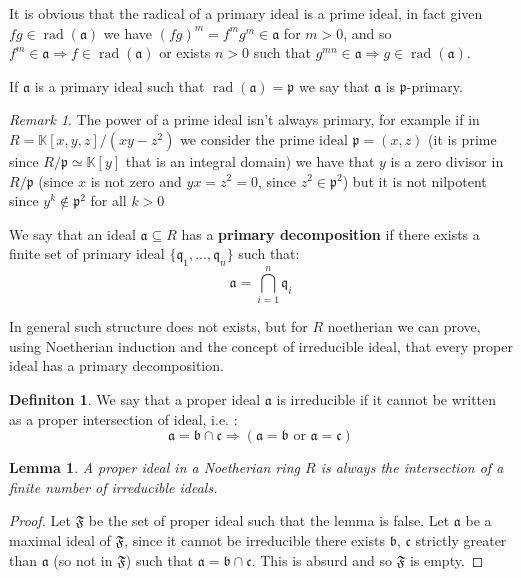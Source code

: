 \documentclass[notitlepage, a4]{book}
\theoremstyle{plain}
\newtheorem{lem}[teo]{Lemma}
\theoremstyle{remark}
\newtheorem{rem}{Remark}
\theoremstyle{definition}
\newtheorem{deff}[teo]{Definiton}
\newcommand{\K}{\mathbb{K}}
\newcommand{\p}{\mathfrak{p}}
\newcommand{\q}{\mathfrak{q}}
\newcommand{\A}{\mathfrak{a}}
\newcommand{\B}{\mathfrak{b}}
\newcommand{\Cc}{\mathfrak{c}}
\DeclareMathOperator{\rad}{rad}
\begin{document}
It is obvious that the radical of a primary ideal is a prime ideal, in fact given $ fg \in \rad(\A)  $ we have $ (fg)^m = f^m g^m \in \A $ for $ m>0 $, and so $ f^m \in \A \Rightarrow f \in \rad(\A)$ or exists $ n>0 $ such that $ g^{mn} \in \A \Rightarrow g \in \rad(\A) $.

If $ \A $ is a primary ideal such that $ \rad(\A) = \p $ we say that $ \A $ is {$ \p $-primary}.

\begin{rem} \label{rem:power_primary} The power of a prime ideal isn't always primary, for example if in $ R = \K[x,y,z] / (xy - z^2) $ we consider the prime ideal $ \p = (x,z) $ (it is prime since $ R / \p \simeq \K[y]$ that is an integral domain) we have that $ y $ is a zero divisor in $R/\p $ (since $ x $ is not zero and $ yx = z^2 = 0 $, since $z^2 \in \p^2 $) but it is not nilpotent since $ y^k \not \in \p^2 $ for all $ k>0 $
\end{rem}

We say that an ideal $ \A \subseteq R $ has a \textbf{primary decomposition}  if there exists a finite set of primary ideal $ \{ \q_1 , ... , \q_n\} $ such that:
\begin{equation*}
	\A = \bigcap_{i=1}^n \q_i
\end{equation*}

In general such structure does not exists, but for $ R $ noetherian we can prove, using Noetherian induction and the concept of irreducible ideal, that every proper ideal has a primary decomposition.

\begin{deff}
	We say that a proper ideal $ \A $ is irreducible if it cannot be written as a proper intersection of ideal, i.e. :
	\begin{equation*}
		\A = \B \cap \Cc \Longrightarrow (\A = \B \text{ or } \A = \Cc)
	\end{equation*}
\end{deff}

\begin{lem}
	A proper ideal in a Noetherian ring $ R $ is always the intersection of a finite number of irreducible ideals.
\end{lem}

\begin{proof}
	Let $ \mathfrak{F} $ be the set of proper ideal such that the lemma is false. Let $ \A $ be a maximal ideal of $ \mathfrak{F} $, since it cannot be irreducible there exists $ \B $, $ \Cc $ strictly greater than $ \A $ (so not in $ \mathfrak{F} $) such that $ \A = \B \cap \Cc $. This is absurd and so $ \mathfrak{F} $ is empty.
\end{proof}
\end{document}

